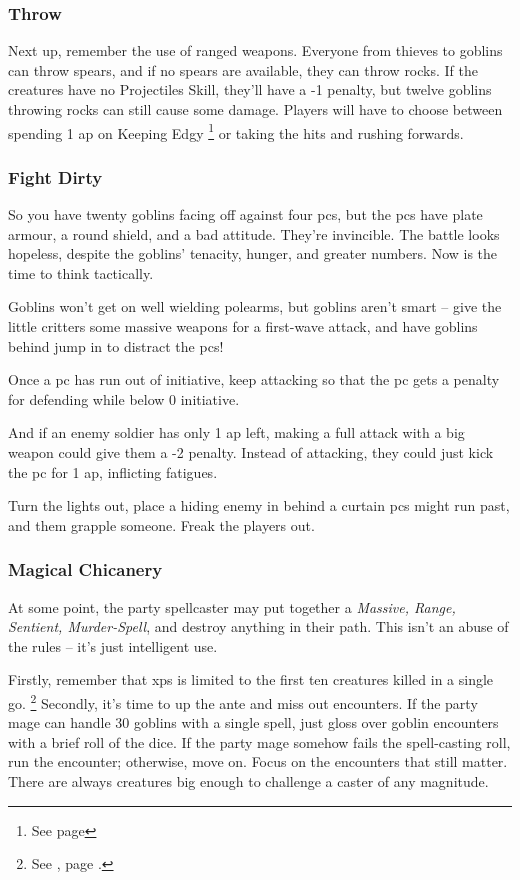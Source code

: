 \begin{multicols}{2}
\subsubsection{Throw}

Next up, remember the use of ranged weapons.
Everyone from thieves to goblins can throw spears, and if no spears are available, they can throw rocks.
If the creatures have no Projectiles Skill, they'll have a -1 penalty, but twelve goblins throwing rocks can still cause some damage.
Players will have to choose between spending 1 \gls{ap} on Keeping Edgy%
\footnote{See page \pageref{edgy}}
 or taking the hits and rushing forwards.

\subsubsection{Fight Dirty}

So you have twenty goblins facing off against four \glspl{pc}, but the \glspl{pc} have plate armour, a round shield, and a bad attitude.
They're invincible.
The battle looks hopeless, despite the goblins' tenacity, hunger, and greater numbers.
Now is the time to think tactically.

Goblins won't get on well wielding polearms, but goblins aren't smart -- give the little critters some massive weapons for a first-wave attack, and have goblins behind jump in to distract the \glspl{pc}!

Once a \gls{pc} has run out of initiative, keep attacking so that the \gls{pc} gets a penalty for defending while below 0 initiative.

And if an enemy soldier has only 1 \gls{ap} left, making a full attack with a big weapon could give them a -2 penalty.
Instead of attacking, they could just kick the \gls{pc} for 1 \gls{ap}, inflicting \glspl{fatigue}.

Turn the lights out, place a hiding enemy in behind a curtain \glspl{pc} might run past, and them grapple someone.
Freak the players out.

\subsubsection{Magical Chicanery}

At some point, the party spellcaster may put together a \textit{Massive, Range, Sentient, Murder-Spell}, and destroy anything in their path.
This isn't an abuse of the rules -- it's just intelligent use.

Firstly, remember that \glspl{xp} is limited to the first ten creatures killed in a single go.%
\footnote{See , page \pageref{xpCreatureMax}.}
Secondly, it's time to up the ante and miss out encounters.
If the party mage can handle 30 goblins with a single spell, just gloss over goblin encounters with a brief roll of the dice.
If the party mage somehow fails the spell-casting roll, run the encounter; otherwise, move on.
Focus on the encounters that still matter.
There are always creatures big enough to challenge a caster of any magnitude.

\end{multicols}

